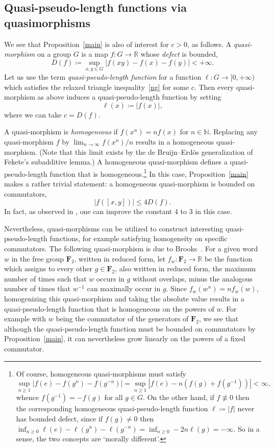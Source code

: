\documentclass[11pt,a4paper,reqno]{amsart}
\numberwithin{equation}{section}
\theoremstyle{plain}
\theoremstyle{definition}
\newcommand\R{\mathbb{R}}
\newcommand\N{\mathbb{N}}
\newcommand\normsymb{\ell}  %
\newcommand\norm[1]{\ell({#1})}   %
\newcommand\free[1]{\mathbf{F}_{#1}}
\begin{document}
\subsection{Quasi-pseudo-length functions via quasimorphisms}

We see that Proposition~\ref{main} is also of interest for $c > 0$, as
follows. A \emph{quasi-morphism} on a group $G$ is a map $f : G \to \R$
whose \emph{defect} is bounded,
\[
	D(f) \coloneqq \sup_{x,y\in G} | f(xy) - f(x) - f(y) | < +\infty.
\]
Let us use the term \emph{quasi-pseudo-length function} for a function
$\normsymb : G \to [0,+\infty)$ which satisfies the relaxed triangle
inequality~\eqref{ng} for some $c$. Then every quasi-morphism as above
induces a quasi-pseudo-length function by setting
\begin{equation}\label{quasimortonorm}
	\norm{ x } \coloneqq | f(x) |,
\end{equation}
where we can take $c = D(f)$.

A quasi-morphism is \emph{homogeneous} if $f( x^n ) = n f( x )$ for $n
\in \N$. Replacing any quasi-morphism $f$ by
$\lim_{n \to \infty} f( x^n) / n$ results in a homogeneous
quasi-morphism. (Note that this limit exists by the de Bruijn--Erd\"os
generalization \cite[Theorem 23]{BE} of Fekete's subadditive lemma.)
A homogeneous quasi-morphism defines a quasi-pseudo-length function that
is homogeneous.\footnote{Of course, homogeneous quasi-morphisms must
satisfy
\[
\sup_{n \geq 1} |f(e) - f(g^n) - f(g^{-n})| = \sup_{n \geq 1} |f(e) -
n(f(g) + f(g^{-1}))| < \infty,
\]
whence $f(g^{-1}) = -f(g)$ for all $g \in G$. On the other hand, if $f
\not\equiv 0$ then the corresponding homogeneous quasi-pseudo-length
function $\normsymb \coloneqq |f|$ never has bounded defect, since if
$f(g) \neq 0$ then $\inf_{n \geq 0} \norm{e} - \norm{g^n} - \norm{g^{-n}}
= \inf_{n \geq 0} -2n \norm{g} = -\infty$. So in a sense, the two
concepts are `morally different'.}
In this case, Proposition~\ref{main} makes a rather trivial statement: a
homogeneous quasi-morphism is bounded on commutators,
\[
	| f([x,y]) | \leq 4 D(f).
\]
In fact, as observed in \cite[Lemme~1.1]{Br}, one can improve the
constant $4$ to $3$ in this case.

Nevertheless, quasi-morphisms can be utilized to construct interesting
quasi-pseudo-length functions, for example satisfying homogeneity on
specific commutators. The following quasi-morphism is due to
Brooks~\cite[Section~2]{Fu}.
For a given word $w$ in the free group $\free{2}$, written in reduced
form, let $f_w : \free{2} \to \R$ be the function which assigns to every
other $g\in \free{2}$, also written in reduced form, the maximum number
of times such that $w$ occurs in $g$ without overlaps, minus the
analogous number of times that $w^{-1}$ can maximally occur in $g$. Since
$f_w(w^n) = n f_w(w)$, homogenizing this quasi-morphism and taking the
absolute value results in a quasi-pseudo-length function that is
homogeneous on the powers of $w$. For example with $w$ being the
commutator of the generators of $\free{2}$, we see that although the
quasi-pseudo-length function must be bounded on commutators by
Proposition~\ref{main}, it can nevertheless grow linearly on the powers
of a fixed commutator.
\end{document}
